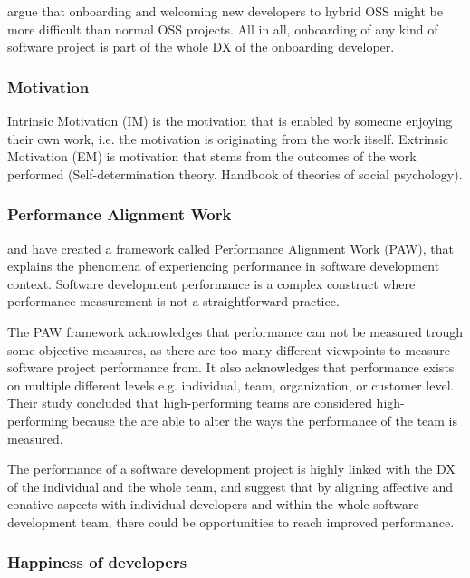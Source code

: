 \documentclass[english, 12pt, a4paper, sci, utf8, a-1b, online]{aaltothesis}
\begin{document}
\textcite{entering-an-ecosystem} argue that onboarding and welcoming new developers to hybrid OSS might be more difficult than normal OSS projects. All in all, onboarding of any kind of software project is part of the whole DX of the onboarding developer.

\subsubsection{Motivation}

Intrinsic Motivation (IM) is the motivation that is enabled by someone enjoying their own work, i.e. the motivation is originating from the work itself. Extrinsic Motivation (EM) is motivation that stems from the outcomes of the work performed \parencite{flow-intrinsic-dx} (Self-determination theory. Handbook of theories of social psychology).

\subsubsection{Performance Alignment Work}

\textcite{how-developers-experience-team-performance} and \textcite{paw} have created a framework called Performance Alignment Work (PAW), that explains the phenomena of experiencing performance in software development context. Software development performance is a complex construct where performance measurement is not a straightforward practice.

The PAW framework acknowledges that performance can not be measured trough some objective measures, as there are too many different viewpoints to measure software project performance from. It also acknowledges that performance exists on multiple different levels e.g. individual, team, organization, or customer level. Their study concluded that high-performing teams are considered high-performing because the are able to alter the ways the performance of the team is measured.

The performance of a software development project is highly linked with the DX of the individual and the whole team, and \textcite{how-developers-experience-team-performance} suggest that by aligning affective and conative aspects with individual developers and within the whole software development team, there could be opportunities to reach improved performance.

\subsubsection{Happiness of developers}
\end{document}
